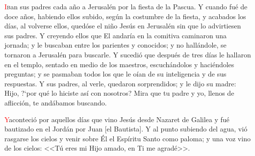 \documentclass[10pt,twoside]{book}
\begin{document}
\vspace{0.5em}



\vspace{1.5em}

\noindent{}
\lettrine[lines=2]{\textcolor{red}{I}}ban sus padres cada año a Jerusalén por la fiesta de la Pascua. Y cuando fué de doce años, habiendo ellos subido, según la costumbre de la fiesta,
y acabados los días, al volverse ellos, quedóse el niño Jesús en Jerusalén sin que lo advirtiesen sus padres. Y creyendo ellos que El andaría en la comitiva caminaron una jornada; y le
buscaban entre los parientes y conocidos; y no hallándole, se tornaron a Jerusalén para buscarle. Y sucedió que después de tres días le hallaron en el templo,
sentado en medio de los maestros, escuchándolos y haciéndoles preguntas; y se pasmaban todos los que le oían de su inteligencia y de sus respuestas.
Y sus padres, al verle, quedaron sorprendidos; y le dijo su madre: Hijo, {?`}por qué lo hiciste así con nosotros? Mira que tu padre y yo, llenos de aflicción, 
te andábamos buscando.

\vspace{0.5em}

{}

\vspace{0.5em}

\iralfinal

\vspace{1.5em}

\noindent{}

\vspace{1.5em}

\noindent{}
\lettrine[lines=2]{\textcolor{red}{Y}}\space aconteció por aquellos días que vino Jesús desde Nazaret de Galilea y fué bautizado en el Jordán por Juan [el Bautista].
Y al punto subiendo del agua, vió rasgarse los cielos y venir sobre Él el Espíritu Santo como paloma; y una voz vino de los cielos: 
<<Tú eres mi Hijo amado, en Ti me agradé>>.

\vspace{0.5em}
\end{document}
